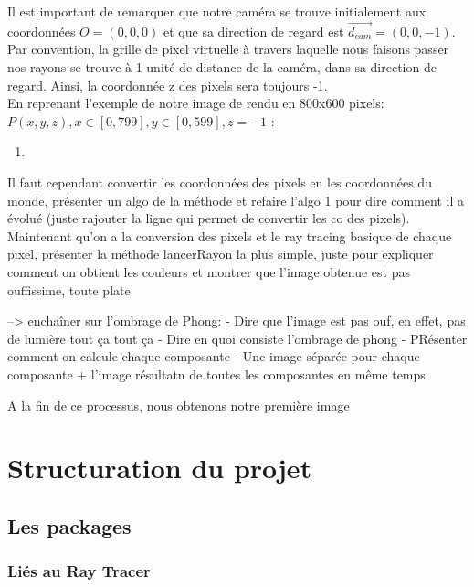 \documentclass[11pt]{article}
\begin{document}
Il est important de remarquer que notre caméra se trouve initialement aux coordonnées $O = (0, 0, 0)$ et que sa direction de regard est $\overrightarrow{d_{cam}} = (0, 0, -1)$. Par convention, la grille de pixel virtuelle à travers laquelle nous faisons passer nos rayons se trouve à 1 unité de distance de la caméra, dans sa direction de regard. Ainsi, la coordonnée z des pixels sera toujours -1.\\
En reprenant l'exemple de notre image de rendu en 800x600 pixels:\\
$P(x, y, z), x \in [0, 799], y \in [0, 599], z = -1$ :
\begin{enumerate}
	\item{}
\end{enumerate}
Il faut cependant convertir les coordonnées des pixels en les coordonnées du monde, présenter un algo de la méthode et refaire l'algo 1 pour dire comment il a évolué (juste rajouter la ligne qui permet de convertir les co des pixels). 
Maintenant qu'on a la conversion des pixels et le ray tracing basique de chaque pixel, présenter la méthode lancerRayon la plus simple, juste pour expliquer comment on obtient les couleurs et montrer que l'image obtenue est pas ouffissime, toute plate

--> enchaîner sur l'ombrage de Phong:
	- Dire que l'image est pas ouf, en effet, pas de lumière tout ça tout ça
	- Dire en quoi consiste l'ombrage de phong
	- PRésenter comment on calcule chaque composante
	- Une image séparée pour chaque composante + l'image résultatn de toutes les composantes en même temps

A la fin de ce processus, nous obtenons notre première image 

\section{Structuration du projet}
\subsection{Les packages}
\subsubsection{Liés au Ray Tracer}
\end{document}
